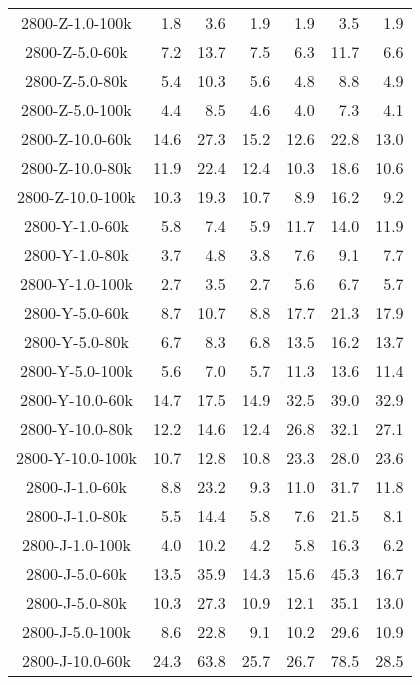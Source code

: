 \begin{longtable}{crrrrrr}
      2800-Z-1.0-100k  &   1.8 &   3.6 &   1.9 &   1.9 &   3.5 &   1.9 \\
      2800-Z-5.0-60k   &   7.2 &  13.7 &   7.5 &   6.3 &  11.7 &   6.6 \\
      2800-Z-5.0-80k   &   5.4 &  10.3 &   5.6 &   4.8 &   8.8 &   4.9 \\
      2800-Z-5.0-100k  &   4.4 &   8.5 &   4.6 &   4.0 &   7.3 &   4.1 \\
      2800-Z-10.0-60k  &  14.6 &  27.3 &  15.2 &  12.6 &  22.8 &  13.0 \\
      2800-Z-10.0-80k  &  11.9 &  22.4 &  12.4 &  10.3 &  18.6 &  10.6 \\
      2800-Z-10.0-100k &  10.3 &  19.3 &  10.7 &   8.9 &  16.2 &   9.2 \\
      2800-Y-1.0-60k   &   5.8 &   7.4 &   5.9 &  11.7 &  14.0 &  11.9 \\
      2800-Y-1.0-80k   &   3.7 &   4.8 &   3.8 &   7.6 &   9.1 &   7.7 \\
      2800-Y-1.0-100k  &   2.7 &   3.5 &   2.7 &   5.6 &   6.7 &   5.7 \\
      2800-Y-5.0-60k   &   8.7 &  10.7 &   8.8 &  17.7 &  21.3 &  17.9 \\
      2800-Y-5.0-80k   &   6.7 &   8.3 &   6.8 &  13.5 &  16.2 &  13.7 \\
      2800-Y-5.0-100k  &   5.6 &   7.0 &   5.7 &  11.3 &  13.6 &  11.4 \\
      2800-Y-10.0-60k  &  14.7 &  17.5 &  14.9 &  32.5 &  39.0 &  32.9 \\
      2800-Y-10.0-80k  &  12.2 &  14.6 &  12.4 &  26.8 &  32.1 &  27.1 \\
      2800-Y-10.0-100k &  10.7 &  12.8 &  10.8 &  23.3 &  28.0 &  23.6 \\
      2800-J-1.0-60k   &   8.8 &  23.2 &   9.3 &  11.0 &  31.7 &  11.8 \\
      2800-J-1.0-80k   &   5.5 &  14.4 &   5.8 &   7.6 &  21.5 &   8.1 \\
      2800-J-1.0-100k  &   4.0 &  10.2 &   4.2 &   5.8 &  16.3 &   6.2 \\
      2800-J-5.0-60k   &  13.5 &  35.9 &  14.3 &  15.6 &  45.3 &  16.7 \\
      2800-J-5.0-80k   &  10.3 &  27.3 &  10.9 &  12.1 &  35.1 &  13.0 \\
      2800-J-5.0-100k  &   8.6 &  22.8 &   9.1 &  10.2 &  29.6 &  10.9 \\
      2800-J-10.0-60k  &  24.3 &  63.8 &  25.7 &  26.7 &  78.5 &  28.5 \\

\end{longtable}
